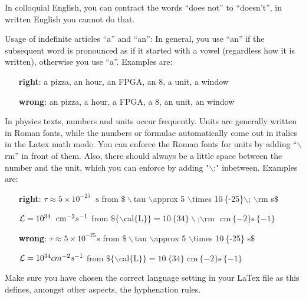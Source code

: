 \documentclass[bachelor,       %
               twoside,        %
               BCOR10mm,       %
               ngerman,english  %
               ]{GAUBM}
\begin{document}
In colloquial English, you can contract the words ``does not'' to
``doesn't'', in written English you cannot do that.

Usage of indefinite articles ``a'' and ``an'': In general, you use
``an'' if the subsequent word is pronounced as if it started with a
vowel (regardless how it is written), otherwise you use ``a''. Examples are:
\begin{enumerate}
\item[\textbf{ right}:] a pizza, an hour, an FPGA, an 8, a unit, a window
\item[\textbf{ wrong}:] an pizza, a hour, a FPGA, a 8, an unit, an window
\end{enumerate}

In physics texts, numbers and units occur frequently. Units are
generally written in Roman fonts, while the numbers or formulae
automatically come out in italics in the Latex math mode. You can
enforce the Roman fonts for units by adding ``$\backslash$rm'' in
front of them. Also, there should always be a little space between the
number and the unit, which you can enforce by adding "$\backslash$;"
inbetween. Examples are:
\begin{enumerate}
\item[\textbf{ right}:] $\tau \approx 5 \times 10^{-25}\;\textrm{ s}$ from 
                  $\$\backslash$tau $\backslash$approx 5 $\backslash$times 10$\hat{\ }$\{-25\}$\backslash$; $\backslash$rm s$\$$
\item[\textbf{ }      ] ${\cal{L}} = 10^{34}\;\textrm{ cm}^{-2}s^{-1}$ from 
                  $\$\{\backslash$cal$\{$L$\}\} = 10\hat{\ }\{34\}{\backslash}$;$\backslash$rm $\textrm{ cm}\hat{\ }\{-2\}$s$\hat{\ }\{-1\}$
\item[\textbf{ wrong}:] $\tau \approx 5 \times 10^{-25}s$\; from
                  $\$\backslash$tau $\backslash$approx 5 $\backslash$times 10$\hat{\ }$\{-25\} s$\$$
\item[\textbf{ }      ] ${\cal{L}} = 10^{34}cm^{-2}s^{-1}$ from
                  $\$\{\backslash$cal$\{$L$\}\} = 10\hat{\ }\{34\}\textrm{ cm}\hat{\ }\{-2\}$s$\hat{\ }\{-1\}$
\end{enumerate}

Make sure you have chosen the correct language setting in your LaTex
file as this defines, amongst other aspects, the hyphenation rules.
\end{document}
